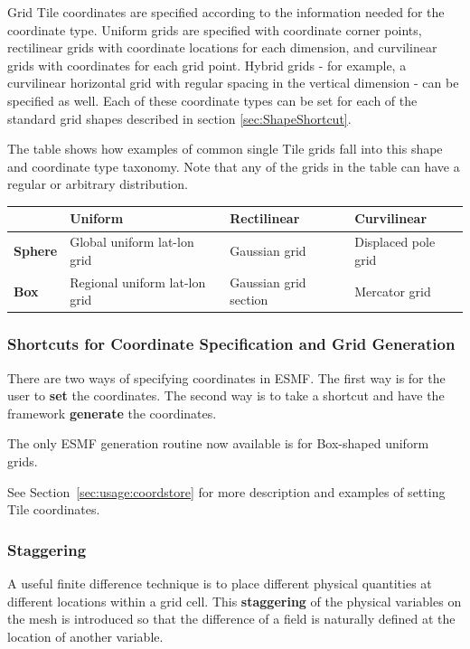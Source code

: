 Grid Tile coordinates are specified
according to the information needed for the coordinate type.
Uniform grids are specified with coordinate corner
points, rectilinear grids with coordinate locations for each dimension,
and curvilinear grids with coordinates for each grid point.  Hybrid
grids - for example, a curvilinear horizontal grid with regular spacing
in the vertical dimension - can be specified as well.  Each of these
coordinate types can be set for each of the standard grid shapes
described in section \ref{sec:ShapeShortcut}.  

The table shows how examples of common single Tile grids fall 
into this shape and coordinate type taxonomy.  Note that any
of the grids in the table can have a regular or arbitrary distribution.

\medskip
\begin{tabular}{|p{.9in}|p{1.7in}|p{1.7in}|p{1.7in}|}
\hline
 & {\bf Uniform} & {\bf Rectilinear} & {\bf Curvilinear} \\ 
\hline
{\bf Sphere} & Global uniform lat-lon grid & Gaussian grid & Displaced pole grid \\
\hline
{\bf Box} & Regional uniform lat-lon grid & Gaussian grid section & Mercator grid \\
\hline
\end{tabular}

\subsubsection{Shortcuts for Coordinate Specification and Grid Generation}

There are two ways of specifying coordinates in ESMF.  The
first way is for the user to {\bf set} the coordinates.  The second 
way is to take a shortcut and have the framework {\bf generate}
the coordinates.  

The only ESMF generation routine now available is for Box-shaped
uniform grids.

See Section~\ref{sec:usage:coordstore} for more description and examples of
setting Tile coordinates.

\subsubsection{Staggering}

A useful finite difference technique is to place different physical
quantities at different locations within a grid cell. This {\bf staggering}
of the physical variables on the mesh is introduced so that the difference
of a field is naturally defined at the location of another variable. 

